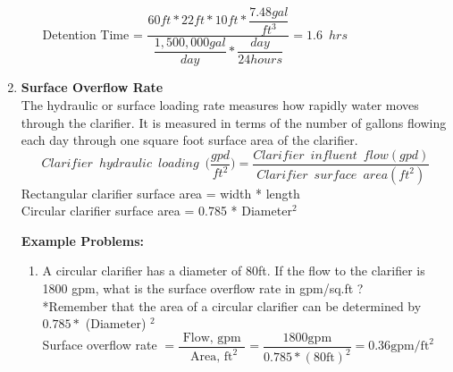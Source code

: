 \begin{enumerate}
\begin{enumerate}[1.]
\vspace{0.2cm}

Detention Time = $\dfrac{60 ft * 22 ft * 10 ft * \dfrac{7.48 gal}{ft^3}}{\dfrac{1,500,000 gal}{day}* \dfrac{day}{24 hours}}=\boxed{1.6 \enspace hrs}$
\end{enumerate}

\item \textbf{Surface Overflow Rate}\\
The hydraulic or surface loading rate measures how rapidly water moves through the clarifier.  It is measured in terms of the number of gallons flowing each day through one square foot surface area of the clarifier. 
$$Clarifier \enspace hydraulic \enspace loading \enspace 	\Big(\dfrac{gpd}{ft^2}\Big) =\dfrac{Clarifier \enspace influent 	\enspace flow (gpd)}{Clarifier \enspace surface \enspace area 	(ft^2)}$$ 
		Rectangular clarifier surface area  = width * length\\
		Circular clarifier surface area  = 0.785 * Diameter$^2 $\\
\vspace{0.2cm}

\textbf{Example Problems:}\\
\begin{enumerate}[1.]
\item A circular clarifier has a diameter of 80ft. If the flow to the clarifier is 1800 gpm, what is the surface overflow rate in gpm/sq.ft ?\\
\vspace{0.2cm}
*Remember that the area of a circular clarifier can be determined by $0.785 *$ (Diameter) $^{2}$\\
\vspace{0.2cm}
Surface overflow rate $=\dfrac{\text { Flow, gpm }}{\text { Area, } \mathrm{ft}^{2}}=\dfrac{1800 \mathrm{gpm}}{0.785 *(80 \mathrm{ft})^{2}}=\boxed{0.36 \mathrm{gpm} / \mathrm{ft}^{2}}$\\
\vspace{0.2cm}


\end{enumerate}
\end{enumerate}
